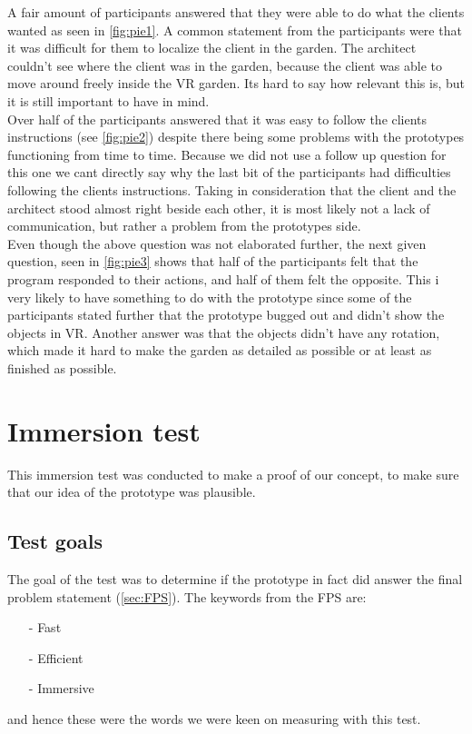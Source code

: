 A fair amount of participants answered that they were able to do what the clients wanted as seen in \ref{fig:pie1}. A common statement from the participants were that it was difficult for them to localize the client in the garden. The architect couldn't see where the client was in the garden, because the client was able to move around freely inside the VR garden. Its hard to say how relevant this is, but it is still important to have in mind.\\


Over half of the participants answered that it was easy to follow the clients instructions (see \autoref{fig:pie2}) despite there being some problems with the prototypes functioning from time to time. Because we did not use a follow up question for this one we cant directly say why the last bit of the participants had difficulties following the clients instructions. Taking in consideration that the client and the architect stood almost right beside each other, it is most likely not a lack of communication, but rather a problem from the prototypes side.\\
Even though the above question was not elaborated further, the next given question, seen in \ref{fig:pie3} shows that half of the participants felt that the program responded to their actions, and half of them felt the opposite. This i very likely to have something to do with the prototype since some of the participants stated further that the prototype bugged out and didn't show the objects in VR. Another answer was that the objects didn't have any rotation, which made it hard to make the garden as detailed as possible or at least as finished as possible.



\section{Immersion test}
This immersion test was conducted to make a proof of our concept, to make sure that our idea of the prototype was plausible.

\subsection{Test goals}
The goal of the test was to determine if the prototype in fact did answer the final problem statement (\autoref{sec:FPS}). The keywords from the FPS are:
\begin{itemize}
	\item[-] Fast
	\item[-] Efficient
	\item[-] Immersive
\end{itemize}
and hence these were the words we were keen on measuring with this test.
